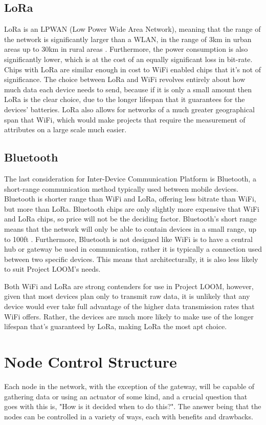 \documentclass[onecolumn, draftclsnofoot,10pt, compsoc]{IEEEtran}
\begin{document}
	\subsection{LoRa}
	LoRa is an LPWAN (Low Power Wide Area Network), meaning that the range of the network is
	significantly larger than a WLAN, in the range of 3km in urban areas up to 30km in rural
	areas \cite{LoRa}. Furthermore, the power consumption is also significantly lower, which is at the cost 
	of an equally significant loss in bit-rate. Chips with LoRa are similar enough in cost to 
	WiFi enabled chips that it's not of significance. The choice between LoRa and WiFi revolves
	entirely about how much data each device needs to send, because if it is only a small amount
	then LoRa is the clear choice, due to the longer lifespan that it guarantees for the devices'
	batteries. LoRa also allows for networks of a much greater geographical span that WiFi, 
	which would make projects that require the measurement of attributes on a large scale
	much easier. 
	\subsection{Bluetooth}
	The last consideration for Inter-Device Communication Platform is Bluetooth, a short-range 
	communication method typically used between mobile devices. Bluetooth is shorter range than
	WiFi and LoRa, offering less bitrate than WiFi, but more than LoRa. Bluetooth chips are only
	slightly more expensive that WiFi and LoRa chips, so price will not be the deciding factor. 
	Bluetooth's short range means that the network will only be able to contain devices in a
	small range, up to 100ft \cite{Bluetooth}. Furthermore, Bluetooth is not designed like WiFi is to
	have a central hub or gateway be used in communication, rather it is typically a connection
	used between two specific devices. This means that architecturally, it is also less likely
	to suit Project LOOM's needs. 
	
Both WiFi and LoRa are strong contenders for use in Project LOOM, however, given that most devices
plan only to transmit raw data, it is unlikely that any device would ever take full advantage of the 
higher data transmission rates that WiFi offers. Rather, the devices are much more likely to make use
of the longer lifespan that's guaranteed by LoRa, making LoRa the most apt choice. 
	
\section{Node Control Structure}
Each node in the network, with the exception of the gateway, will be capable of gathering data or
using an actuator of some kind, and a crucial question that goes with this is, "How is it decided
when to do this?". The answer being that the nodes can be controlled in a variety of ways, each
with benefits and drawbacks.
\end{document}
